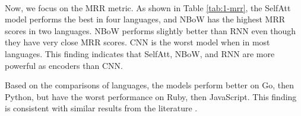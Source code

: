 \documentclass[conference]{IEEEtran}
\begin{document}
\begin{table}[thb]
\centering
\caption{RQ1: MRR Scores of Baseline Models}
~\\
\label{tab:1-mrr}
\end{table}
 

Now, we focus on the MRR metric. As shown in Table \ref{tab:1-mrr}, the SelfAtt model performs the best in four languages, and NBoW has the highest MRR scores in two languages. NBoW performs slightly better than RNN even though they have very close MRR scores. CNN is the worst model when in most languages. This finding indicates that SelfAtt, NBoW, and RNN are more powerful as encoders than CNN.

Based on the comparisons of languages, the models perform better on Go, then Python, but have the worst performance on Ruby, then JavaScript. This finding is consistent with similar results from the literature \cite{Husain2019CodeSearchNetCE}.
\end{document}
